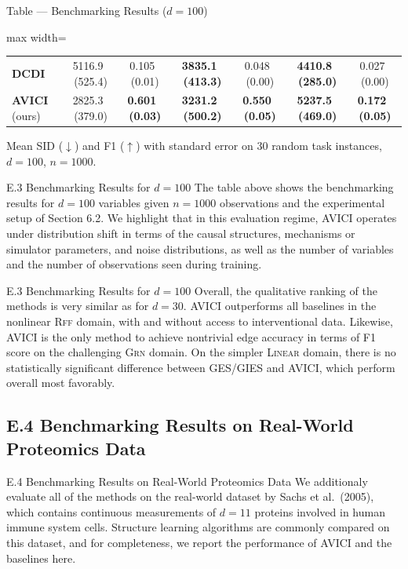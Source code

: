 \documentclass[aspectratio=169,10pt]{beamer}
\newcommand{\err}[1]{\tiny{$\,$(#1)}}
\newcommand{\highlight}[1]{\textbf{#1}}
\newcommand{\domain}[1]{\textsc{#1}}
\newcommand{\lineardomain}{\domain{Linear}\xspace}
\newcommand{\rffdomain}{\domain{Rff}\xspace}
\newcommand{\grndomain}{\domain{Grn}\xspace}
\newcommand{\dcdi}{\textbf{DCDI}}
\newcommand{\oursinterv}{\textbf{AVICI} (ours)}
\newcommand{\ours}{AVICI\xspace}
\begin{document}
\begin{frame}{Table --- Benchmarking Results ($d=100$)}
\begin{adjustbox}{max width=\textwidth}
\begin{tabular}{lcccccc}
\dcdi              &              5116.9 \err{525.4} &              0.105 \err{0.01} &  \highlight{3835.1 \err{413.3}} &              0.048 \err{0.00} &  \highlight{4410.8 \err{285.0}} &              0.027 \err{0.00} \\
\oursinterv &              2825.3 \err{379.0} &  \highlight{0.601 \err{0.03}} &  \highlight{3231.2 \err{500.2}} &  \highlight{0.550 \err{0.05}} &  \highlight{5237.5 \err{469.0}} &  \highlight{0.172 \err{0.05}} \\
\bottomrule
\end{tabular}
\end{adjustbox}

\vspace{0.2cm}
{\footnotesize Mean SID ($\downarrow$) and F1 ($\uparrow$) with standard error on \num{30} random task instances, $d=100$, $n=1000$.}
\end{frame}

\begin{frame}{E.3 Benchmarking Results for $d=100$}
\small
The table above shows the benchmarking results for $d=100$ variables given $n=1000$ observations and the experimental setup of Section 6.2. We highlight that in this evaluation regime, \ours operates under distribution shift in terms of the causal structures, mechanisms or simulator parameters, and noise distributions, as well as the number of variables and the number of observations seen during training.
\end{frame}

\begin{frame}{E.3 Benchmarking Results for $d=100$}
\small
Overall, the qualitative ranking of the methods is very similar as for $d=30$. \ours outperforms all baselines in the nonlinear \rffdomain domain, with and without access to interventional data. Likewise, \ours is the only method to achieve nontrivial edge accuracy in terms of F1 score on the challenging \grndomain domain. On the simpler \lineardomain domain, there is no statistically significant difference between GES/GIES and \ours, which perform overall most favorably.
\end{frame}

\subsection{E.4 Benchmarking Results on Real-World Proteomics Data}

\begin{frame}{E.4 Benchmarking Results on Real-World Proteomics Data}
\small
We additionaly evaluate all of the methods on the real-world dataset by Sachs et al.\ (2005), which contains continuous measurements of $d=11$ proteins involved in human immune system cells. Structure learning algorithms are commonly compared on this dataset, and for completeness, we report the performance of \ours and the baselines here.
\end{frame}
\end{document}
